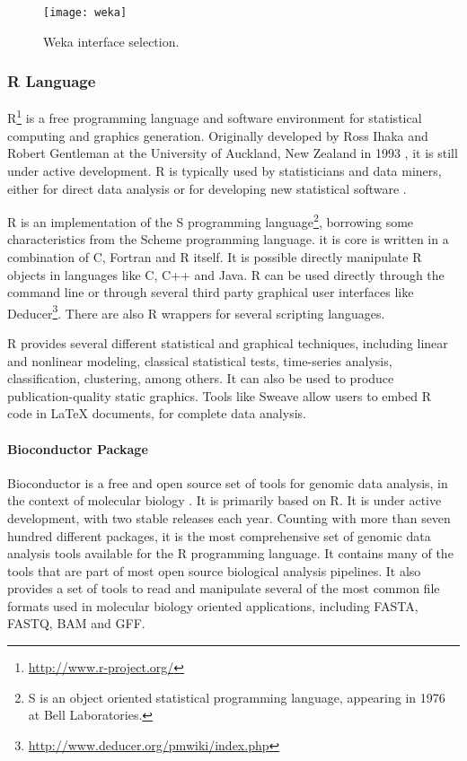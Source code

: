 \begin{figure}[!htb]
  \begin{center}
    \leavevmode
    \texttt{[image: weka]}
    \caption[Weka interface selection]{Weka interface selection.}
    \label{fig:weka}
  \end{center}
\end{figure}

\subsubsection*{R Language}

R\footnote{\url{http://www.r-project.org/}} is a free programming language and
software environment for statistical computing and graphics generation.
Originally developed by Ross Ihaka and Robert Gentleman at the University of
Auckland, New Zealand in 1993 \cite{Ihaka1998}, it is still under active
development. R is typically used by statisticians and data miners, either for
direct data analysis or for developing new statistical software \cite{Fox2005}.

R is an implementation of the S programming language\footnote{S is an object
oriented statistical programming language, appearing in 1976 at Bell
Laboratories.}, borrowing some characteristics from the Scheme programming
language. it is core is written in a combination of C, Fortran and R itself. It
is possible directly manipulate R objects in languages like C, C++ and Java. R
can be used directly through the command line or through several third party
graphical user interfaces like
Deducer\footnote{\url{http://www.deducer.org/pmwiki/index.php}}. There are also
R wrappers for several scripting languages.

R provides several different statistical and graphical techniques, including
linear and nonlinear modeling, classical statistical tests, time-series
analysis, classification, clustering, among others. It can also be used to
produce publication-quality static graphics. Tools like Sweave
\cite{lmucs-papers:Leisch:2002} allow users to embed R code in \LaTeX{}
documents, for complete data analysis.

\paragraph{Bioconductor Package}

Bioconductor is a free and open source set of tools for genomic data analysis,
in the context of molecular biology \cite{lmucs-papers:Leisch:2002}. It is
primarily based on R. It is under active development, with two stable releases
each year. Counting with more than seven hundred different packages, it is the
most comprehensive set of genomic data analysis tools available for the R
programming language. It contains many of the tools that are part of most open
source biological analysis pipelines. It also provides a set of tools to read
and manipulate several of the most common file formats used in molecular biology
oriented applications, including FASTA, FASTQ, BAM and GFF.


